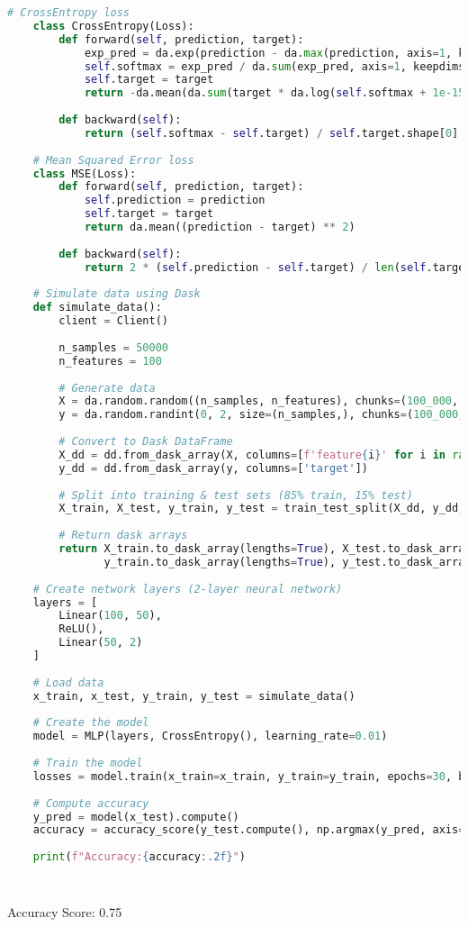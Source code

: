 \documentclass[12pt,letterpaper]{article}
\begin{document}
\begin{lstlisting}[language=Python, frame=single, breaklines=true]
    # CrossEntropy loss
    class CrossEntropy(Loss):
        def forward(self, prediction, target):
            exp_pred = da.exp(prediction - da.max(prediction, axis=1, keepdims=True))
            self.softmax = exp_pred / da.sum(exp_pred, axis=1, keepdims=True)
            self.target = target
            return -da.mean(da.sum(target * da.log(self.softmax + 1e-15), axis=1))
    
        def backward(self):
            return (self.softmax - self.target) / self.target.shape[0]
    
    # Mean Squared Error loss
    class MSE(Loss):
        def forward(self, prediction, target):
            self.prediction = prediction
            self.target = target
            return da.mean((prediction - target) ** 2)
    
        def backward(self):
            return 2 * (self.prediction - self.target) / len(self.target)
    
    # Simulate data using Dask 
    def simulate_data():
        client = Client()  
    
        n_samples = 50000
        n_features = 100
    
        # Generate data 
        X = da.random.random((n_samples, n_features), chunks=(100_000, n_features))
        y = da.random.randint(0, 2, size=(n_samples,), chunks=(100_000,))
    
        # Convert to Dask DataFrame
        X_dd = dd.from_dask_array(X, columns=[f'feature{i}' for i in range(n_features)])
        y_dd = dd.from_dask_array(y, columns=['target'])
    
        # Split into training & test sets (85% train, 15% test)
        X_train, X_test, y_train, y_test = train_test_split(X_dd, y_dd, test_size=0.15, random_state=42)
    
        # Return dask arrays
        return X_train.to_dask_array(lengths=True), X_test.to_dask_array(lengths=True), \
               y_train.to_dask_array(lengths=True), y_test.to_dask_array(lengths=True)
    
    # Create network layers (2-layer neural network)
    layers = [
        Linear(100, 50),
        ReLU(),
        Linear(50, 2)
    ]
    
    # Load data
    x_train, x_test, y_train, y_test = simulate_data()
    
    # Create the model
    model = MLP(layers, CrossEntropy(), learning_rate=0.01)
    
    # Train the model
    losses = model.train(x_train=x_train, y_train=y_train, epochs=30, batch_size=1000)
    
    # Compute accuracy
    y_pred = model(x_test).compute()
    accuracy = accuracy_score(y_test.compute(), np.argmax(y_pred, axis=1))
    
    print(f"Accuracy:{accuracy:.2f}")
    
    
\end{lstlisting}
Accuracy Score: 0.75
\end{document}
